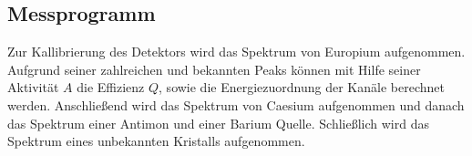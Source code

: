 \subsection{Messprogramm}

Zur Kallibrierung des Detektors wird das Spektrum von Europium aufgenommen. Aufgrund seiner zahlreichen und bekannten Peaks können mit Hilfe seiner Aktivität $A$
die Effizienz $Q$, sowie die Energiezuordnung der Kanäle berechnet werden. Anschließend wird das Spektrum von Caesium aufgenommen und danach das Spektrum einer
Antimon und einer Barium Quelle. Schließlich wird das Spektrum eines unbekannten Kristalls aufgenommen. 
